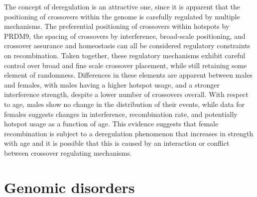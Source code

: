 
The concept of deregulation is an attractive one, since it is apparent that the positioning of crossovers within the genome is carefully regulated by multiple mechanisms.
The preferential positioning of crossovers within hotspots by PRDM9, the spacing of crossovers by interference, broad-scale positioning, and crossover assurance and homeostasis can all be considered regulatory constraints on recombination.
Taken together, these regulatory mechanisms exhibit careful control over broad and fine scale crossover placement, while still retaining some element of randomness.
Differences in these elements are apparent between males and females, with males having a higher hotspot usage, and a stronger interference strength, despite a lower number of crossovers overall.
With respect to age, males show no change in the distribution of their events, while data for females suggests changes in interference, recombination rate, and potentially hotspot usage as a function of age.
This evidence suggests that female recombination is subject to a deregulation phenomenon that increases in strength with age and
it is possible that this is caused by an interaction or conflict between crossover regulating mechanisms.


% 


\section{Genomic disorders}

% 

